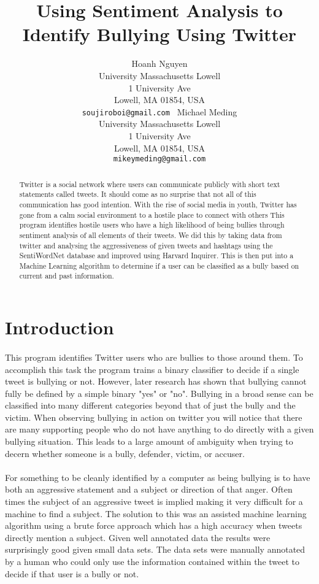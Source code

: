 \documentclass[11pt,letterpaper]{article}
\title{
Using Sentiment Analysis to Identify Bullying Using Twitter
    }
\author{Hoanh Nguyen\\
	    University Massachusetts Lowell\\
	     1 University Ave\\
	     Lowell, MA 01854, USA\\
	    {\tt soujiroboi@gmail.com }
	  \And
	Michael Meding\\
  	University Massachusetts Lowell\\
	     1 University Ave\\
	     Lowell, MA 01854, USA\\
  {\tt mikeymeding@gmail.com}}
\date{}
\begin{document}
\maketitle
\begin{abstract}
  Twitter is a social network where users can communicate publicly with short text statements called tweets. It should come as no surprise that not all of this communication has good intention. With the rise of social media in youth, Twitter has gone from a calm social environment to a hostile place to connect with others This program identifies hostile users who have a high likelihood of being bullies through sentiment analysis of all elements of their tweets. We did this by taking data from twitter and analysing the aggressiveness of given tweets and hashtags using the SentiWordNet database and improved using Harvard Inquirer. This is then put into a Machine Learning algorithm to determine if a user can be classified as a bully based on current and past information.
\end{abstract}

\section{Introduction}
\paragraph{}
This program identifies Twitter users who are bullies to those around them. To accomplish this task the program trains a binary classifier to decide if a single tweet is bullying or not. However, later research has shown that bullying cannot fully be defined by a simple binary "yes" or "no". Bullying in a broad sense can be classified into many different categories beyond that of just the bully and the victim. When observing bullying in action on twitter you will notice that there are many supporting people who do not have anything to do directly with a given bullying situation. This leads to a large amount of ambiguity when trying to decern whether someone is a bully, defender, victim, or accuser.
\paragraph{}
For something to be cleanly identified by a computer as being bullying is to have both an aggressive statement and a subject or direction of that anger. Often times the subject of an aggressive tweet is implied making it very difficult for a machine to find a subject. The solution to this was an assisted machine learning algorithm using a brute force approach which has a high accuracy when tweets directly mention a subject. Given well annotated data the results were surprisingly good given small data sets. The data sets were manually annotated by a human who could only use the information contained within the tweet to decide if that user is a bully or not.
\end{document}
